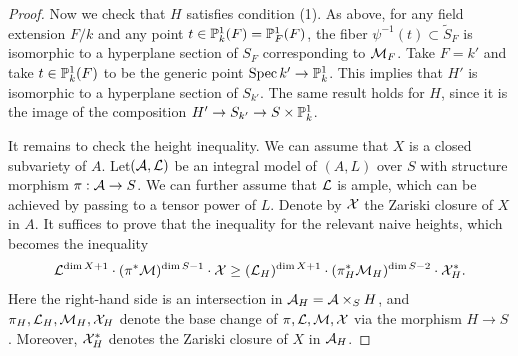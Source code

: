 \documentclass[12pt]{amsart}
\begin{document}
\begin{proof}
Now we check that $H$ satisfies condition (1). 
As above, for any field extension $F/k$ and any point $t\in \P^1_k(F)=\P^1_F(F)$, the fiber $\psi^{-1}(t)\subset \widetilde S_F$ is isomorphic to a hyperplane section of $S_F$ corresponding to $\sM_F$. 
Take $F=k'$ and take
$t\in \P^1_k(F)$ to be the generic point $\Spec k'\to \P^1_k$.
This implies that $H'$ is isomorphic to a hyperplane section of $S_{k'}$. 
The same result holds for $H$, since it is the image of the composition $H'\to S_{k'} \to S\times \P^1_k$.

It remains to check the height inequality. 
We can assume that $X$ is a closed subvariety of $A$. 
Let$(\sA,\sL)$ be an integral model of $(A,L)$ over $S$ with structure morphism $\pi:\sA\to S$. 
We can further assume that $\sL$ is ample, which can be achieved by passing to a tensor power of $L$. 
Denote by $\sX$ the Zariski closure of $X$ in $A$.
It suffices to prove that the inequality for the relevant naive heights, which becomes the inequality
$$
\sL^{\dim X+1}\cdot (\pi^*\sM)^{\dim S-1} \cdot \sX
\geq (\sL_H)^{\dim X+1}\cdot (\pi_H^*\sM_H)^{\dim S-2} \cdot \sX_H^*.
$$
Here the right-hand side is an intersection in $\sA_H=\sA\times_SH$, and $\pi_H,\sL_H,\sM_H, \sX_H$ denote the base change of $\pi,\sL,\sM, \sX$ via the morphism $H\to S$.
Moreover, $\sX_H^*$ denotes the Zariski closure of $X$ in $\sA_H$. 


\end{proof}
\end{document}
